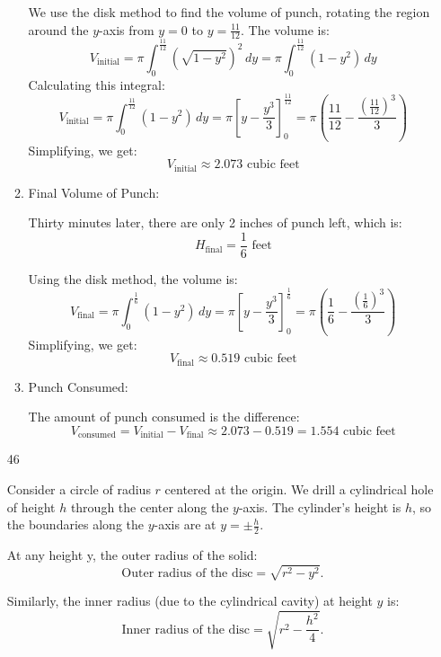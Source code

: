 \documentclass[12pt]{article}
\begin{document}
\begin{enumerate}[start=1,label={\bfseries. },leftmargin=1in]
\begin{enumerate}
        We use the disk method to find the volume of punch, rotating the region around the \( y \)-axis from \( y = 0 \) to \( y = \frac{11}{12} \). The volume is:
        \[
        V_{\text{initial}} = \pi \int_0^{\frac{11}{12}} \left(\sqrt{1 - y^2}\right)^2 \, dy = \pi \int_0^{\frac{11}{12}} (1 - y^2) \, dy
        \]
        Calculating this integral:
        \[
        V_{\text{initial}} = \pi \int_0^{\frac{11}{12}} (1 - y^2) \, dy = \pi \left[ y - \frac{y^3}{3} \right]_0^{\frac{11}{12}} = \pi \left( \frac{11}{12} - \frac{\left(\frac{11}{12}\right)^3}{3} \right)
        \]
        Simplifying, we get:
        \[
        V_{\text{initial}} \approx 2.073 \text{ cubic feet}
        \]
        
        \item Final Volume of Punch:
        
        Thirty minutes later, there are only 2 inches of punch left, which is:
        \[
        H_{\text{final}} = \frac{1}{6} \text{ feet}
        \]
        
        Using the disk method, the volume is:
        \[
        V_{\text{final}} = \pi \int_0^{\frac{1}{6}} (1 - y^2) \, dy = \pi \left[ y - \frac{y^3}{3} \right]_0^{\frac{1}{6}} = \pi \left( \frac{1}{6} - \frac{\left(\frac{1}{6}\right)^3}{3} \right)
        \]
        Simplifying, we get:
        \[
        V_{\text{final}} \approx 0.519 \text{ cubic feet}
        \]
        
        \item Punch Consumed:
        
        The amount of punch consumed is the difference:
        \[
        V_{\text{consumed}} = V_{\text{initial}} - V_{\text{final}} \approx 2.073 - 0.519 = 1.554 \text{ cubic feet}
        \]
    \end{enumerate}
    \item [46]

    Consider a circle of radius \( r \) centered at the origin. We drill a cylindrical hole of height \( h \) through the center along the \( y \)-axis. The cylinder’s height is \( h \), so the boundaries along the \( y \)-axis are at \( y = \pm \frac{h}{2} \).

    At any height y, the outer radius of the solid:
    \[
    \text{Outer radius of the disc} = \sqrt{r^2 - y^2}.
    \]

    Similarly, the inner radius (due to the cylindrical cavity) at height \( y \) is:
    \[
    \text{Inner radius of the disc} = \sqrt{r^2 - \frac{h^2}{4}}.
    \]


\end{enumerate}
\end{document}
